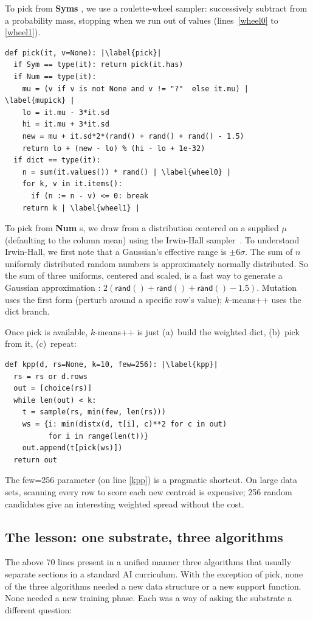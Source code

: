 \documentclass[AMA,STIX2COL]{WileyNJDv5}
\newcommand{\cls}[1]{%
  \setlength{\fboxsep}{1.5pt}%
  \colorbox{clsbg}{\sffamily\bfseries{#1}}%
}
\begin{document}
 To pick from \cls{Syms}, we use a 
roulette-wheel sampler: successively subtract from a probability mass,
stopping when we run out of values
 (lines~\ref{wheel0} to \ref{wheel1}).
\begin{lstlisting}
def pick(it, v=None): |\label{pick}|
  if Sym == type(it): return pick(it.has)
  if Num == type(it):
    mu = (v if v is not None and v != "?"  else it.mu) | \label{mupick} |
    lo = it.mu - 3*it.sd
    hi = it.mu + 3*it.sd
    new = mu + it.sd*2*(rand() + rand() + rand() - 1.5)
    return lo + (new - lo) % (hi - lo + 1e-32)
  if dict == type(it):
    n = sum(it.values()) * rand() | \label{wheel0} |
    for k, v in it.items():
      if (n := n - v) <= 0: break
    return k | \label{wheel1} |
\end{lstlisting}
To pick from \cls{Num}s, we draw from a distribution centered on a supplied $\mu$ (defaulting to
the column mean) using the Irwin-Hall
sampler~\cite{johnson1995continuous}. 
To understand Irwin-Hall, we first note that a Gaussian's effective range is
$\pm 6\sigma$. The sum of $n$ uniformly distributed random numbers is approximately
normally distributed. So the sum of three uniforms, centered and
scaled, is a fast way to generate a Gaussian approximation : $2(\textsf{rand}() + \textsf{rand}() + \textsf{rand}() -
1.5)$. Mutation uses the first form (perturb around
a specific row's value); $k$-means++ uses the dict branch.

 
Once \textsf{pick} is available, $k$-means++ is just (a)~build
the weighted dict, (b)~pick from it, (c)~repeat:

\begin{lstlisting}
def kpp(d, rs=None, k=10, few=256): |\label{kpp}|
  rs = rs or d.rows
  out = [choice(rs)]
  while len(out) < k:
    t = sample(rs, min(few, len(rs)))
    ws = {i: min(distx(d, t[i], c)**2 for c in out)
          for i in range(len(t))}
    out.append(t[pick(ws)])
  return out
\end{lstlisting}
The \textsf{few=256} parameter  (on line \ref{kpp}) is a pragmatic shortcut. On large
data sets, scanning every row to score each new centroid is
expensive; 256 random candidates give an interesting weighted
spread without the cost.

\subsection*{The lesson: one substrate, three algorithms}
The above 70 lines present in a unified manner three algorithms that
usually separate sections in a standard AI curriculum.
With the exception of \textsf{pick},
none of the three algorithms needed a new data structure or a
new support function. None needed a new training phase. Each was
a way of asking the substrate a different question:
\end{document}
